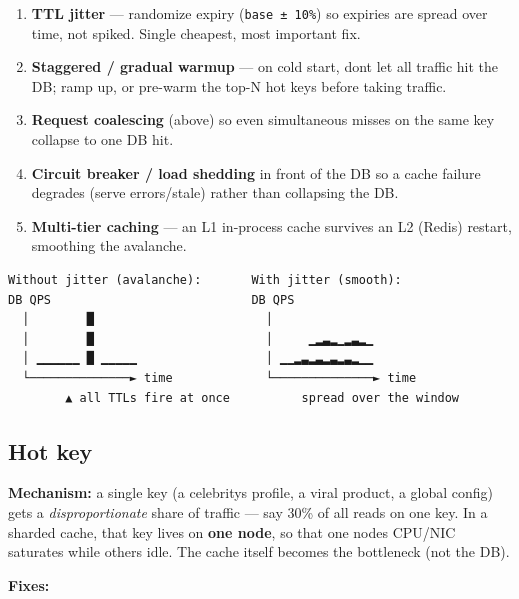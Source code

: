 \documentclass[11pt]{article}
\providecommand{\tightlist}{\setlength{\itemsep}{1pt}\setlength{\parskip}{0pt}}
\begin{document}
\begin{enumerate}
\def\labelenumi{\arabic{enumi}.}
\tightlist
\item
  \textbf{TTL jitter} --- randomize expiry (\texttt{base\ ±\ 10\%}) so expiries are spread over time, not spiked. Single cheapest, most important fix.
\item
  \textbf{Staggered / gradual warmup} --- on cold start, don\textquotesingle t let all traffic hit the DB; ramp up, or pre-warm the top-N hot keys before taking traffic.
\item
  \textbf{Request coalescing} (above) so even simultaneous misses on the same key collapse to one DB hit.
\item
  \textbf{Circuit breaker / load shedding} in front of the DB so a cache failure degrades (serve errors/stale) rather than collapsing the DB.
\item
  \textbf{Multi-tier caching} --- an L1 in-process cache survives an L2 (Redis) restart, smoothing the avalanche.
\end{enumerate}

\setcodelang{}

\begin{verbatim}
Without jitter (avalanche):       With jitter (smooth):
DB QPS                            DB QPS
  │        █                        │
  │        █                        │     ▁▂▃▂▁▂▃▂▁
  │ ▁▁▁▁▁▁ █ ▁▁▁▁▁                  │ ▁▁▂▃▂▃▂▃▂▃▂▁▁
  └──────────────► time             └──────────────► time
        ▲ all TTLs fire at once          spread over the window
\end{verbatim}

\subsection{Hot key}\label{hot-key}

\textbf{Mechanism:} a single key (a celebrity\textquotesingle s profile, a viral product, a global config) gets a \emph{disproportionate} share of traffic --- say 30\% of all reads on one key. In a sharded cache, that key lives on \textbf{one node}, so that one node\textquotesingle s CPU/NIC saturates while others idle. The cache itself becomes the bottleneck (not the DB).

\textbf{Fixes:}
\end{document}
